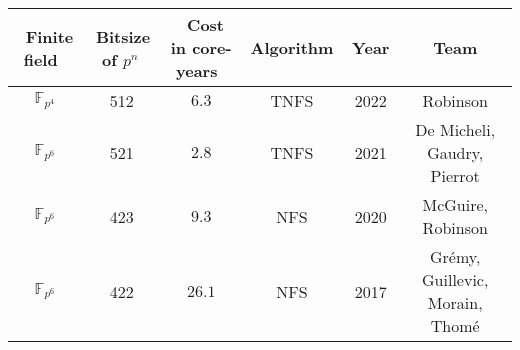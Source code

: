 \documentclass[preview]{standalone}
\begin{document}
\begin{center}
\begin{tabular}{|c|c|c|c|c|c|}
        \hline
        $ \,$ Finite field $ \,$ & $ \,$Bitsize of $p^n \,$ & $ \,$ Cost in core-years $ \,$ & $ \,$ Algorithm $ \,$ & $ \,$ Year$ \,$ & $ \,$ Team $ \,$ \\
        \hline
        $\mathbb{F}_{p^4}$ & 512 & $6.3$ & TNFS  & 2022 & Robinson \\
        $\mathbb{F}_{p^6}$ & 521 & $2.8$ & TNFS  & 2021 & De Micheli, Gaudry, Pierrot \\
        $\mathbb{F}_{p^6}$ & 423 & $9.3$ & NFS  & 2020 & McGuire, Robinson\\
        $\mathbb{F}_{p^6}$ & 422 & $26.1$ & NFS  & 2017 & Grémy, Guillevic, Morain, Thomé \\
        \hline
    \end{tabular}
\end{center}
\end{document}
